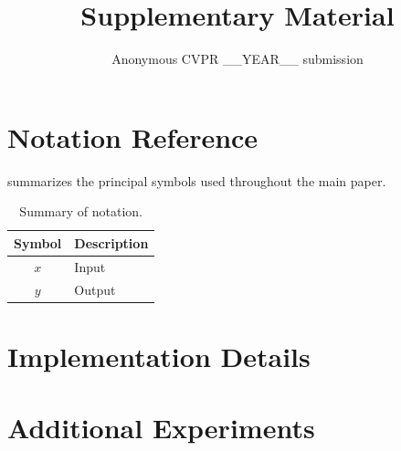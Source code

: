 \documentclass[10pt,twocolumn,letterpaper]{article}
\begin{document}
\title{Supplementary Material}
\author{Anonymous CVPR __YEAR__ submission}
\maketitle

\setcounter{page}{1}

\section{Notation Reference}
\label{sec:supp_notation}

 summarizes the principal symbols used throughout the main paper.

\begin{table}[t]
\centering
\caption{Summary of notation.}
\label{tab:notation}
\renewcommand{\arraystretch}{1.15}
\begin{tabular}{@{}cl@{}}
\toprule
\textbf{Symbol} & \textbf{Description} \\
\midrule
$x$             & Input \\
$y$             & Output \\
\bottomrule
\end{tabular}
\end{table}

\section{Implementation Details}
\label{sec:supp_impl}


\section{Additional Experiments}
\label{sec:supp_experiments}

\end{document}
